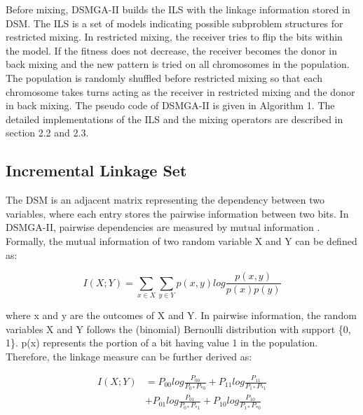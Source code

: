 \documentclass{sig-alternate-05-2015}
\begin{document}
Before mixing, DSMGA-II builds the ILS with the linkage information stored in DSM. The ILS is a set of models indicating possible subproblem structures for restricted mixing. In restricted mixing, the receiver tries to flip the bits within the model. If the fitness does not decrease, the receiver becomes the donor in back mixing and the new pattern is tried on all chromosomes in the population. The population is randomly shuffled before restricted mixing so that each chromosome takes turns acting as the receiver in restricted mixing and the donor in back mixing. The pseudo code of DSMGA-II is given in Algorithm 1. The detailed implementations of the ILS and the mixing operators are described in section 2.2 and 2.3. 



\subsection{Incremental Linkage Set}
The DSM is an adjacent matrix representing the dependency between two variables, where each entry stores the pairwise information between two bits. In DSMGA-II, pairwise dependencies are measured by mutual information \cite{kullback:KL-diversion}. Formally, the mutual information of two random variable X and Y can be defined as:

\begin{displaymath} 
I(X;Y) = \sum_{x \in X}\sum_{y \in Y} p(x,y)  log \frac{p(x,y)}{p(x) p(y)} 
\end{displaymath}

where x and y are the outcomes of X and Y. In pairwise information, the random variables X and Y follows the (binomial) Bernoulli distribution with support \{0, 1\}. p(x) represents the portion of a bit having value 1 in the population. Therefore, the linkage measure can be further derived as:

\begin{equation} 
\begin{split}
I(X;Y) &= P_{00 }log\frac{P_{00}}{P_{0*} P_{*0}} + P_{11 }log\frac{P_{11}}{P_{1*} P_{*1}}  \\
	    &+ P_{01 }log\frac{P_{01}}{P_{0*} P_{*1}} + P_{10 }log\frac{P_{10}}{P_{1*} P_{*0}}  
\end{split}
\end{equation}
\end{document}
